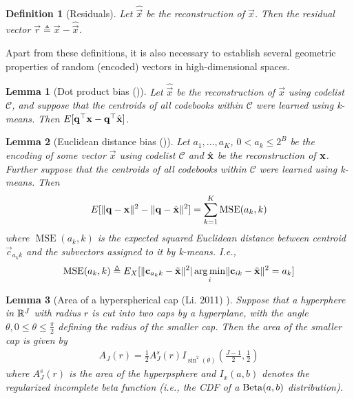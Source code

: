 \documentclass[]{article}
\newtheorem{lemma}{Lemma}[section]
\newtheorem{definition}{Definition}[section]
\DeclareMathOperator{\MSE}{MSE}
\begin{document}
\begin{definition}[Residuals]
Let $\hat{\vec{x}}$ be the reconstruction of $\vec{x}$. Then the residual vector $\vec{r} \triangleq \vec{x} - \hat{\vec{x}}$.
\end{definition}

Apart from these definitions, it is also necessary to establish several geometric properties of random (encoded) vectors in high-dimensional spaces.



\begin{lemma}[Dot product bias (\cite{pairQ})]
Let $\hat{\vec{x}}$ be the reconstruction of $\vec{x}$ using codelist $\mathcal{C}$, and suppose that the centroids of all codebooks within $\mathcal{C}$ were learned using k-means. Then $E[\mathbf{q}^\top \mathbf{x} - \mathbf{q}^\top \hat{\mathbf{x}}]$.
\end{lemma}

\begin{lemma}[Euclidean distance bias (\cite{pq, pairQ})]
Let $a_1,\ldots,a_K$, $0 < a_k \le 2^B$ be the encoding of some vector $\vec{x}$ using codelist $\mathcal{C}$ and $\hat{\mathbf{x}}$ be the reconstruction of $\mathbf{x}$. Further suppose that the centroids of all codebooks within $\mathcal{C}$ were learned using k-means. Then
\begin{align}
    E[\norm{\q - \x}^2 - \norm{\q - \xhat}^2] = \sum_{k=1}^K \MSE(a_k, k)
\end{align}
where $\MSE(a_k, k)$ is the expected squared Euclidean distance between centroid $\vec{c}_{a{_k}k}$ and the subvectors assigned to it by k-means. I.e.,
\begin{align}
    \MSE(a_k, k) \triangleq E_X[\norm{\vec{c}_{a{_k}k} - \tilde{\x}}^2 | \argmin_i \norm{\vec{c}_{ik} - \tilde{\x}}^2 = a_k ]
\end{align}
\end{lemma}

\begin{lemma}[Area of a hyperspherical cap (Li. 2011) \cite{}] \label{thm:cap_area}
Suppose that a hyperphere in $\mathbb{R}^J$ with radius $r$ is cut into two caps by a hyperplane, with the angle $\theta, 0 \le \theta \le \frac{\pi}{2}$ defining the radius of the smaller cap. Then the area of the smaller cap is given by
\begin{align}
    A_J(r) = \frac{1}{2} A^s_J(r) I_{\sin^2(\theta)} \left( \frac{J-1}{2}, \frac{1}{2} \right)
\end{align}
where $A^s_J(r)$ is the area of the hyperpsphere and $I_x(a, b)$ denotes the regularized incomplete beta function (i.e., the CDF of a $\operatorname{Beta}(a, b)$ distribution).
\end{lemma}
\end{document}
